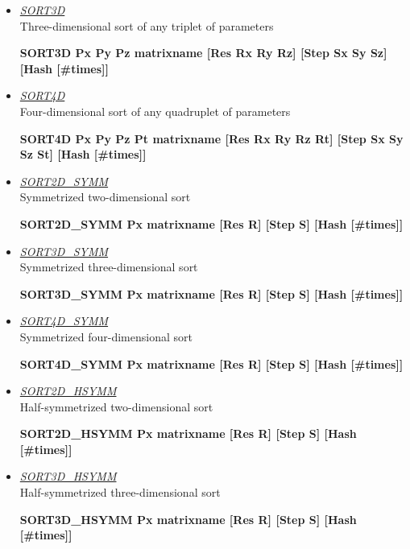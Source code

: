 \begin{itemize}
 \item	{\it\underline{SORT3D}} \\
	{\sc Three-dimensional sort of any triplet of parameters	}

	\smallskip
	{\bf SORT3D Px Py Pz matrixname [Res Rx Ry Rz] [Step Sx Sy Sz] [Hash 
	[\#times]]} \\

 \item	{\it\underline{SORT4D}} \\
	{\sc Four-dimensional sort of any quadruplet of parameters	}

	\smallskip
	{\bf SORT4D Px Py Pz Pt matrixname [Res Rx Ry Rz Rt] [Step Sx Sy Sz St] 
	[Hash [\#times]]} \\

 \item	{\it\underline{SORT2D\_SYMM}} \\
	{\sc Symmetrized two-dimensional sort 	}

	\smallskip
	{\bf SORT2D\_SYMM Px matrixname [Res R] [Step S] [Hash [\#times]]} \\

 \item	{\it\underline{SORT3D\_SYMM}} \\
	{\sc Symmetrized three-dimensional sort }

	\smallskip
	{\bf SORT3D\_SYMM Px matrixname [Res R] [Step S] [Hash [\#times]]} \\

 \item	{\it\underline{SORT4D\_SYMM}} \\
	{\sc Symmetrized four-dimensional sort	}

	\smallskip
	{\bf SORT4D\_SYMM Px matrixname [Res R] [Step S] [Hash [\#times]]} \\

 \item	{\it\underline{SORT2D\_HSYMM}} \\
	{\sc Half-symmetrized two-dimensional sort }	

	\smallskip
	{\bf SORT2D\_HSYMM Px matrixname [Res R] [Step S] [Hash [\#times]]} \\

 \item	{\it\underline{SORT3D\_HSYMM}} \\
	{\sc Half-symmetrized three-dimensional sort }

	\smallskip
	{\bf SORT3D\_HSYMM Px matrixname [Res R] [Step S] [Hash [\#times]]} \\


\end{itemize}
